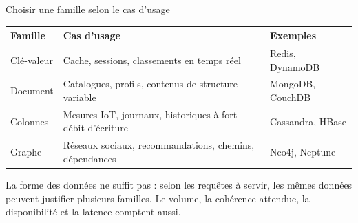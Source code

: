\begin{frame}{Choisir une famille selon le cas d'usage}
    \small
    \begin{tabular}{p{}p{}p{}}
        \toprule
        \textbf{Famille} & \textbf{Cas d'usage}                                       & \textbf{Exemples} \\
        \midrule
        Clé-valeur       & Cache, sessions, classements en temps réel                 & Redis, DynamoDB   \\
        Document         & Catalogues, profils, contenus de structure variable        & MongoDB, CouchDB  \\
        Colonnes         & Mesures IoT, journaux, historiques à fort débit d'écriture & Cassandra, HBase  \\
        Graphe           & Réseaux sociaux, recommandations, chemins, dépendances     & Neo4j, Neptune    \\
        \bottomrule
    \end{tabular}

    \vspace{0.3cm}

    La forme des données ne suffit pas : selon les requêtes à servir, les mêmes
    données peuvent justifier plusieurs familles. Le volume, la cohérence
    attendue, la disponibilité et la latence comptent aussi.

\end{frame}

